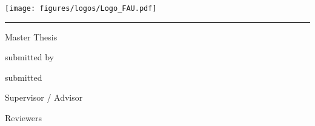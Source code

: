 \begin{titlepage}
\begin{localsize}{11}
\begin{center}
\begin{center}
\vspace*{0.5cm}

\texttt{[image: figures/logos/Logo\_FAU.pdf]}
\end{center}
\vspace{0.0cm}
\noindent\rule{16cm}{1pt}

\vspace{1cm}
{{\Large Master Thesis}}

\vspace{1cm}
{\myTitle}

\vspace{0.5cm}
{\small{submitted by}\\
\vspace{0.2cm}
\Large{\myName}}

\vspace{0.5cm}
{\small{submitted}\\
\vspace{0.2cm}
\Large{\myTime}

\vspace{1.5cm}}
{\small{Supervisor / Advisor}\\
\vspace{0.2cm}
\Large \mySupervisor}

\vspace{0.5cm}
{\small Reviewers}\\
\vspace{0.2cm}
{\Large \myProf\\
\vspace{0.15cm}
\myOtherProf}
\end{center}

\vspace{5cm}


\end{localsize}
\end{titlepage}
